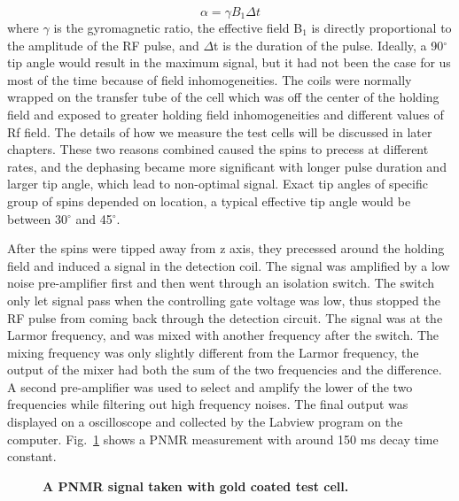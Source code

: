 \begin{equation}\label{tip_angle}
\alpha = \gamma B_{1} \Delta t
\end{equation}
where $\gamma$ is the gyromagnetic ratio, the effective field B$_{1}$ is directly proportional to the amplitude of the RF pulse, and $\Delta$t is the duration of the pulse. Ideally, a 90$^{\circ}$ tip angle would result in the maximum signal, but it had not been the case for us most of the time because of field inhomogeneities. The coils were normally wrapped on the transfer tube of the cell which was off the center of the holding field and exposed to greater holding field inhomogeneities and different values of Rf field. The details of how we measure the test cells will be discussed in later chapters. These two reasons combined caused the spins to precess at different rates, and the dephasing became more significant with longer pulse duration and larger tip angle, which lead to non-optimal signal. Exact tip angles of specific group of spins depended on location, a typical effective tip angle would be between 30$^{\circ}$ and 45$^{\circ}$. 

After the spins were tipped away from z axis, they precessed around the holding field and induced a signal in the detection coil. The signal was amplified by a low noise pre-amplifier first and then went through an isolation switch. The switch only let signal pass when the controlling gate voltage was low, thus stopped the RF pulse from coming back through the detection circuit. The signal was at the Larmor frequency, and was mixed with another frequency after the switch. The mixing frequency was only slightly different from the Larmor frequency, the output of the mixer had both the sum of the two frequencies and the difference. A second pre-amplifier was used to select and amplify the lower of the two frequencies while filtering out high frequency noises. The final output was displayed on a oscilloscope and collected by the Labview program on the computer. Fig.~\ref{FID} shows a PNMR measurement with around 150 ms decay time constant.

\begin{figure}[H]
	\centering
	\caption{{\bf A PNMR signal taken with gold coated test cell.}}
	\label{FID}
\end{figure}

